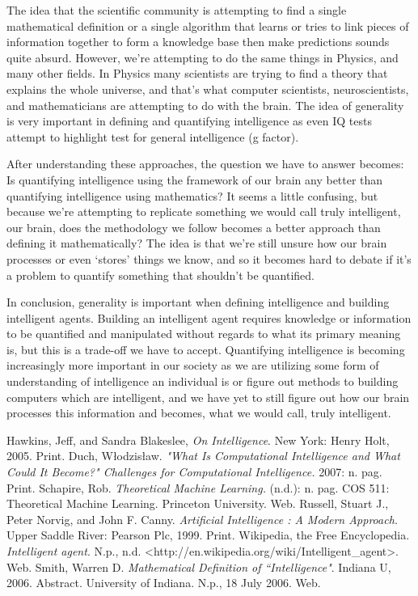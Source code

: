 \documentclass[11pt, oneside]{article}
\begin{document}
\par The idea that the scientific community is attempting to find a single mathematical definition or a single algorithm that learns or tries to link pieces of information together to form a knowledge base then make predictions sounds quite absurd. However, we're attempting to do the same things in Physics, and many other fields. In Physics many scientists are trying to find a theory that explains the whole universe, and that's what computer scientists, neuroscientists, and mathematicians are attempting to do with the brain. The idea of generality is very important in defining and quantifying intelligence as even IQ tests attempt to highlight test for general intelligence (g factor). 

\par After understanding these approaches, the question we have to answer becomes: Is quantifying intelligence using the framework of our brain any better than quantifying intelligence using mathematics? It seems a little confusing, but because we're attempting to replicate something we would call truly intelligent, our brain, does the methodology we follow becomes a better approach than defining it mathematically? The idea is that we're still unsure how our brain processes or even `stores' things we know, and so it becomes hard to debate if it's a problem to quantify something that shouldn't be quantified. 

\par In conclusion, generality is important when defining intelligence and building intelligent agents. Building an intelligent agent requires knowledge or information to be quantified and manipulated without regards to what its primary meaning is, but this is a trade-off we have to accept. Quantifying intelligence is becoming increasingly more important in our society as we are utilizing some form of understanding of intelligence an individual is or figure out methods to building computers which are intelligent, and we have yet to still figure out how our brain processes this information and becomes, what we would call, truly intelligent.

\begin{thebibliography}{9}
	Hawkins, Jeff, and Sandra Blakeslee,
	\emph{On Intelligence}.
	New York: Henry Holt, 2005.
	Print.
	Duch, W\l{}odzis\l{}aw.
	\emph{"What Is Computational Intelligence and What Could It Become?" Challenges for Computational Intelligence.}
	2007: n. pag. Print.
	Schapire, Rob. 
	\emph{Theoretical Machine Learning.} 
	(n.d.): n. pag. COS 511: Theoretical Machine Learning. Princeton University. 
	Web.
	Russell, Stuart J., Peter Norvig, and John F. Canny. 
	\emph{Artificial Intelligence : A Modern Approach.}
	Upper Saddle River: Pearson Plc, 1999. Print.
	Wikipedia, the Free Encyclopedia. 
	\emph{Intelligent agent}.
	N.p., n.d. <http://en.wikipedia.org/wiki/Intelligent\_agent>.
	Web.
	Smith, Warren D. 
	\emph{Mathematical Definition of ``Intelligence"}.
	Indiana U, 2006. Abstract. University of Indiana. N.p., 18 July 2006. 
	Web.
\end{thebibliography}
\end{document}
